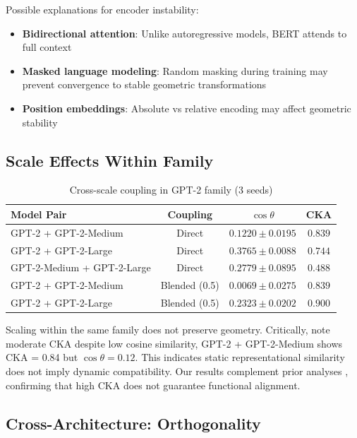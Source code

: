 \documentclass[10pt]{article} %
\theoremstyle{plain}
\theoremstyle{definition}
\theoremstyle{remark}
\begin{document}
Possible explanations for encoder instability:
\begin{itemize}
    \item \textbf{Bidirectional attention}: Unlike autoregressive models, BERT attends to full context
    \item \textbf{Masked language modeling}: Random masking during training may prevent convergence to stable geometric transformations
    \item \textbf{Position embeddings}: Absolute vs relative encoding may affect geometric stability
\end{itemize}

\subsection{Scale Effects Within Family}

\begin{table}[htbp]
\centering
\caption{Cross-scale coupling in GPT-2 family (3 seeds)}
\label{tab:scale}
\small
\begin{tabular}{lccc}
\toprule
\textbf{Model Pair} & \textbf{Coupling} & \textbf{$\cos \theta$} & \textbf{CKA} \\
\midrule
GPT-2 + GPT-2-Medium & Direct & $0.1220 \pm 0.0195$ & $0.839$ \\
GPT-2 + GPT-2-Large & Direct & $0.3765 \pm 0.0088$ & $0.744$ \\
GPT-2-Medium + GPT-2-Large & Direct & $0.2779 \pm 0.0895$ & $0.488$ \\
\midrule
GPT-2 + GPT-2-Medium & Blended (0.5) & $0.0069 \pm 0.0275$ & $0.839$ \\
GPT-2 + GPT-2-Large & Blended (0.5) & $0.2323 \pm 0.0202$ & $0.900$ \\
\bottomrule
\end{tabular}
\end{table}

Scaling within the same family does not preserve geometry. Critically, note moderate CKA despite low cosine similarity, GPT-2 + GPT-2-Medium shows CKA = 0.84 but $\cos \theta = 0.12$. This indicates static representational similarity does not imply dynamic compatibility. Our results complement prior analyses \citep{hauser2021similar,ding2021grounding}, confirming that high CKA does not guarantee functional alignment.

\subsection{Cross-Architecture: Orthogonality}
\end{document}
